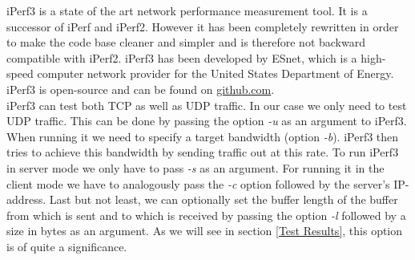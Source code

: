 iPerf3 is a state of the art network performance measurement tool. It is a successor of iPerf and iPerf2. However it has been completely rewritten in order to make the code base cleaner and simpler and is therefore not backward compatible with iPerf2. iPerf3 has been developed by \ac{ESnet}, which is a high-speed computer network provider for the United States Department of Energy. iPerf3 is open-source and can be found on \href{https://github.com/esnet/iperf}{github.com}\cite{mah2018iperf3}.
\\
iPerf3 can test both \ac{TCP} as well as \acs{UDP} traffic. In our case we only need to test \acs{UDP} traffic. This can be done by passing the option \textit{-u} as an argument to iPerf3. When running it we need to specify a target bandwidth (option \textit{-b}). iPerf3 then tries to achieve this bandwidth by sending traffic out at this rate. To run iPerf3 in server mode we only have to pass \textit{-s} as an argument. For running it in the client mode we have to analogously pass the \textit{-c} option followed by the server's \acs{IP}-address. Last but not least, we can optionally set the buffer length of the buffer from which is sent and to which is received by passing the option \textit{-l} followed by a size in bytes as an argument. As we will see in section \ref{Test Results}, this option is of quite a significance.

